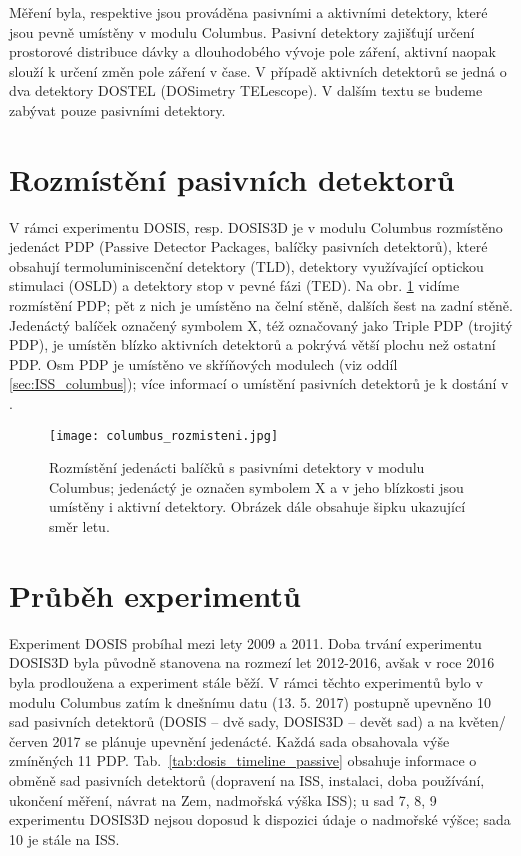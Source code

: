 Měření byla, respektive jsou prováděna pasivními a aktivními detektory, které jsou pevně umístěny v modulu Columbus. Pasivní detektory zajišťují určení prostorové distribuce dávky a dlouhodobého vývoje pole záření, aktivní naopak slouží k určení změn pole záření v čase. V případě aktivních detektorů se jedná o dva detektory DOSTEL (DOSimetry TELescope). V dalším textu se budeme zabývat pouze pasivními detektory.

\section{Rozmístění pasivních detektorů}
V rámci experimentu DOSIS, resp. DOSIS3D je v modulu Columbus rozmístěno jedenáct PDP (Passive Detector Packages, balíčky pasivních detektorů), které obsahují termoluminiscenční detektory (TLD), detektory využívající optickou stimulaci (OSLD) a detektory stop v pevné fázi (TED). Na obr. \ref{fig:columbus_rozmisteni} vidíme rozmístění PDP; pět z nich je umístěno na čelní stěně, dalších šest na zadní stěně. Jedenáctý balíček označený symbolem X, též označovaný jako Triple PDP (trojitý PDP), je umístěn blízko aktivních detektorů a pokrývá větší plochu než ostatní PDP. Osm PDP je umístěno ve skříňových modulech (viz oddíl \ref{sec:ISS_columbus}); více informací o umístění pasivních detektorů je k dostání v \cite{dosis}. %
\begin{figure}[ht]
  \centering
  \texttt{[image: columbus\_rozmisteni.jpg]}
  \caption{Rozmístění jedenácti balíčků s pasivními detektory v modulu Columbus; jedenáctý je označen symbolem X a v jeho blízkosti jsou umístěny i aktivní detektory. Obrázek dále obsahuje šipku ukazující směr letu. \cite{dosis}}
  \label{fig:columbus_rozmisteni}
\end{figure}

\section{Průběh experimentů}%
Experiment DOSIS probíhal mezi lety 2009 a 2011. Doba trvání experimentu DOSIS3D byla původně stanovena na rozmezí let 2012-2016, avšak v roce 2016 byla prodloužena a experiment stále běží. V rámci těchto experimentů bylo v modulu Columbus zatím k dnešnímu datu (13. 5. 2017) postupně upevněno 10 sad pasivních detektorů (DOSIS -- dvě sady, DOSIS3D -- devět sad) a na květen/červen 2017 se plánuje upevnění jedenácté. Každá sada obsahovala výše zmíněných 11 PDP. Tab.~\ref{tab:dosis_timeline_passive} obsahuje informace o obměně sad pasivních detektorů (dopravení na ISS, instalaci, doba používání, ukončení měření,
návrat na Zem, nadmořská výška ISS); u sad 7, 8, 9 experimentu DOSIS3D nejsou doposud k dispozici údaje o nadmořské výšce; sada 10 je stále na ISS. 

